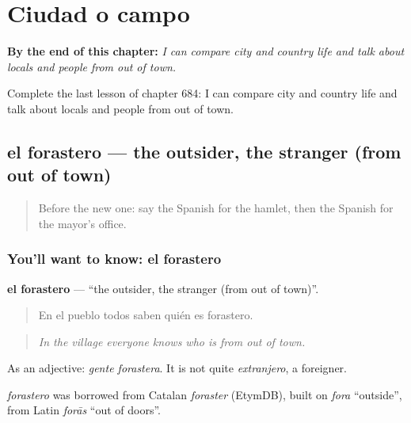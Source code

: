 
\chapter{Ciudad o campo}
\label{ch:es-ciudad-o-campo}

\begin{chapteropening}
\textbf{By the end of this chapter:} \emph{I can compare city and country life and talk about locals and people from out of town.}

Complete the last lesson of chapter 684: I can compare city and country life and talk about locals and people from out of town.
\end{chapteropening}

\section[el forastero]{el forastero — the outsider, the stranger (from out of town)}

\label{lesson:ES-C684-forastero}



\begin{quote}
Before the new one: say the Spanish for the hamlet, then the Spanish for the mayor’s office.
\end{quote}

\subsection*{You'll want to know: el forastero}
\textbf{el forastero} — \textquotedblleft{}the outsider, the stranger (from out of town)\textquotedblright{}.

\begin{quote}
En el pueblo todos saben quién es forastero.
\end{quote}

\begin{quote}
\emph{In the village everyone knows who is from out of town.}
\end{quote}

As an adjective: \emph{gente forastera}. It is not quite \emph{extranjero}, a foreigner.

\begin{cousinweb}
\emph{forastero} was borrowed from Catalan \emph{foraster} (EtymDB), built on \emph{fora} \textquotedblleft{}outside\textquotedblright{}, from Latin \emph{forās} \textquotedblleft{}out of doors\textquotedblright{}.
\end{cousinweb}

